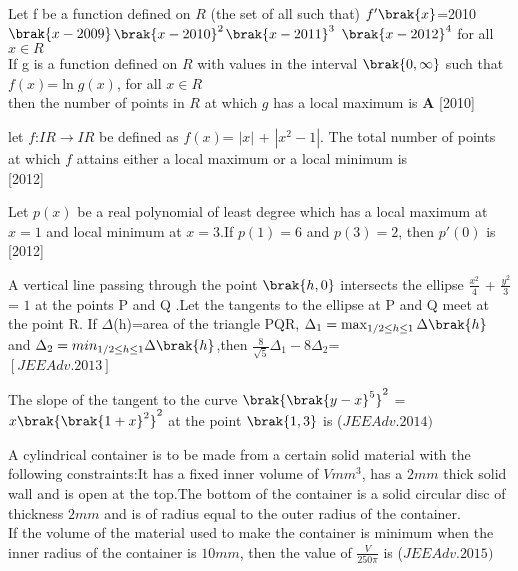 \iffalse
\title{Assignment}
\author{Harshil Rathan}
\section{integer}
\fi

\item Let f be a function defined on $R$ (the set of all such that) $f'\brak{x}$=2010$\brak{x-2009}$$\brak{x-2010}^2$$\brak{x-2011}^3$ $\brak{x-2012}^4$ for all $x \in R$ \\ If g is a function defined on $R$ with values in the interval $\brak{0,\infty}$ such that \\
  $f(x)$=$\ln{g(x)}$, for all $x\in R$\\ then the number of points in $R$ at which $g$ has a local maximum is \textbf{A }\hfill [2010]\\
\item let $f$:$IR \rightarrow IR$ be defined as $f(x)$= $|x|$ + $|x^2-1|$. The total number of points at which $f$ attains either a local maximum or a local minimum is\\ \hfill [2012] \\
\item Let $p(x)$ be a real polynomial of least degree which has a local maximum at $x=1$ and local minimum at $x=3$.If $p(1)=6$ and $p(3)=2$, then $p'(0)$ is \hfill [2012] \\
\item A vertical line passing through the point $\brak{h,0}$ intersects the ellipse $\frac{x^2}{4}$ + $\frac{y^2}{3}$ = $1$ at the points P and Q .Let the tangents to the ellipse at P and Q meet at the point R. If $\Delta$(h)=area of the triangle PQR, $\Delta_1  = \max _{1/2\leq h \leq 1}\Delta\brak{h}$ and $\Delta_2 = min_{1/2\leq h \leq 1}\Delta\brak{h}$,then $\frac{8}{\sqrt{5}}\Delta_1 - 8\Delta_2$=\\\hfill $[JEEAdv.2013]$\\
\item The slope of the tangent to the curve $\brak{\brak{y-x}^5}^2$ = $x\brak{\brak{1+x}^2}^2$ at the point $\brak{1,3}$ is \hfill ($JEE Adv. 2014)$ \\
\item A cylindrical container is to be made from a certain solid material with the following constraints:It has a fixed inner volume of $V mm^3$, has a $2mm$ thick solid wall and is open at the top.The bottom of the container is a solid circular disc of thickness $2mm$ and is of radius equal to the outer radius of the container.\\If the volume of the material used to make the container is minimum when the inner radius of the container is $10mm$, then the value of $\frac{V}{250\pi}$ is \hfill ($JEE Adv. 2015)$ \\  
